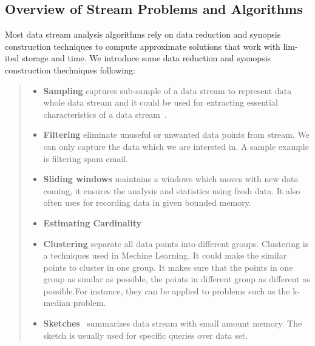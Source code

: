 \subsection{Overview of Stream Problems and Algorithms}
Most data stream analysis algorithms rely on data reduction and synopsis
construction techniques to compute approximate solutions that work with lim-ited
storage and time. We introduce some data reduction and sysnopsis construction
thechniques following:
\begin{quote}
\begin{itemize}
    \item  \textbf{Sampling} captures sub-sample of a data stream to represent
    data whole data stream and it could be used for extracting essential
    characteristics of a data stream~\cite{kejariwal2015real}.
    
    \item \textbf{Filtering} eliminate unuseful or unwanted data points from
    stream. We can only capture the data which we are intersted in. A sample
    example is filtering spam email.
    
    \item \textbf{Sliding windows} maintains a windows which moves with new data
    coming, it ensures the analysis and statistics using fresh data. It also 
    often uses for recording data in given bounded memory.

    \item \textbf{Estimating Cardinality}
    
    
    \item \textbf{Clustering} separate all data points into different groups.
    Clustering is a techniques used in Mechine Learning. It could make the 
    similar points to cluster in one group. It makes sure that the points in one
    group as similar as possible, the points in different group as different as
    possible.For instance, they can be applied to problems such as the k-median 
    problem. 
    
    \item \textbf{Sketches}~\cite{alon1999space} summarizes data stream with 
    small amount memory. The sketch is usually used for specific queries over 
    data set.~\cite{kejariwal2015real}

\begin{comment}
    \item \textbf{Histograms} approximate the distribution of a set of values $v_1, ..., v_n$ by a piecewise constant function $\hat{v}(i),$ so as to minimize the sum of squared error. Equi-width histograms partition the domain into buckets such that the number of $v_i$ values falling into each bucket is uniform across all buckets. End-biased histograms maintain exact counts of items that occur with frequency above a threshold, and approximate the other counts by a uniform distribution~\cite{kejariwal2015real}.
    

\end{comment}
\end{itemize}
\end{quote}
